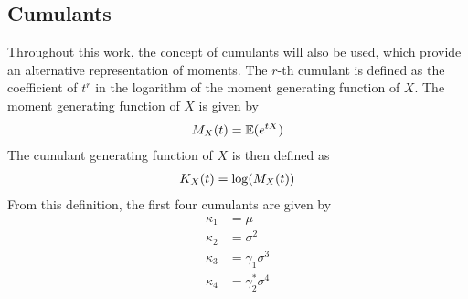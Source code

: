 \subsection{Cumulants}

Throughout this work, the concept of cumulants will also be used, which provide an alternative representation of moments. The $r$-th cumulant is defined as the coefficient of $t^r$ in the logarithm of the moment generating function of $X$. The moment generating function of $X$ is given by
\begin{align}
    M_X(t) = \mathbb{E}(e^{tX})\notag
\end{align}
The cumulant generating function of $X$ is then defined as
\begin{align}
    K_X(t) = \log(M_X(t))\notag
\end{align} 
From this definition, the first four cumulants are given by
\begin{align}
    \label{eq:cumulants_1}
    \kappa_1 &= \mu\\
    \label{eq:cumulants_2}
    \kappa_2 &= \sigma^2\\
    \label{eq:cumulants_3}
    \kappa_3 &= \gamma_1\sigma^3\\
    \label{eq:cumulants_4}
    \kappa_4 &= \gamma_2^*\sigma^4
\end{align}

